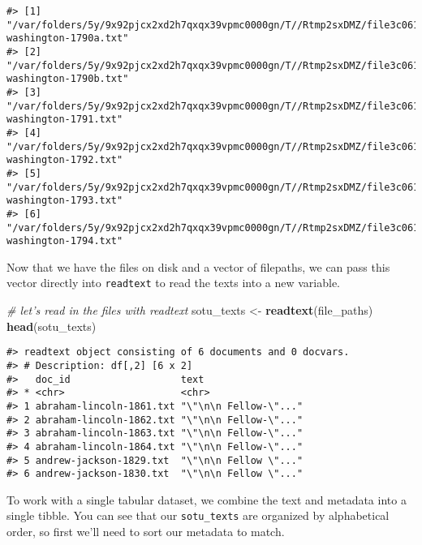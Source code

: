 \documentclass[]{book}
\newenvironment{Shaded}{\begin{snugshade}}{\end{snugshade}}
\newcommand{\CommentTok}[1]{\textcolor[rgb]{0.56,0.35,0.01}{\textit{#1}}}
\newcommand{\KeywordTok}[1]{\textcolor[rgb]{0.13,0.29,0.53}{\textbf{#1}}}
\newcommand{\NormalTok}[1]{#1}
\newcommand{\OperatorTok}[1]{\textcolor[rgb]{0.81,0.36,0.00}{\textbf{#1}}}
\newcommand{\StringTok}[1]{\textcolor[rgb]{0.31,0.60,0.02}{#1}}
\begin{document}
\begin{verbatim}
#> [1] "/var/folders/5y/9x92pjcx2xd2h7qxqx39vpmc0000gn/T//Rtmp2sxDMZ/file3c061f5b124b/george-washington-1790a.txt"
#> [2] "/var/folders/5y/9x92pjcx2xd2h7qxqx39vpmc0000gn/T//Rtmp2sxDMZ/file3c061f5b124b/george-washington-1790b.txt"
#> [3] "/var/folders/5y/9x92pjcx2xd2h7qxqx39vpmc0000gn/T//Rtmp2sxDMZ/file3c061f5b124b/george-washington-1791.txt" 
#> [4] "/var/folders/5y/9x92pjcx2xd2h7qxqx39vpmc0000gn/T//Rtmp2sxDMZ/file3c061f5b124b/george-washington-1792.txt" 
#> [5] "/var/folders/5y/9x92pjcx2xd2h7qxqx39vpmc0000gn/T//Rtmp2sxDMZ/file3c061f5b124b/george-washington-1793.txt" 
#> [6] "/var/folders/5y/9x92pjcx2xd2h7qxqx39vpmc0000gn/T//Rtmp2sxDMZ/file3c061f5b124b/george-washington-1794.txt"
\end{verbatim}

Now that we have the files on disk and a vector of filepaths, we can pass this vector directly into \texttt{readtext} to read the texts into a new variable.

\begin{Shaded}
\begin{Highlighting}[]
\CommentTok{# let's read in the files with readtext}
\NormalTok{sotu_texts <-}\StringTok{ }\KeywordTok{readtext}\NormalTok{(file_paths)}
\KeywordTok{head}\NormalTok{(sotu_texts)}
\end{Highlighting}
\end{Shaded}

\begin{verbatim}
#> readtext object consisting of 6 documents and 0 docvars.
#> # Description: df[,2] [6 x 2]
#>   doc_id                   text                 
#> * <chr>                    <chr>                
#> 1 abraham-lincoln-1861.txt "\"\n\n Fellow-\"..."
#> 2 abraham-lincoln-1862.txt "\"\n\n Fellow-\"..."
#> 3 abraham-lincoln-1863.txt "\"\n\n Fellow-\"..."
#> 4 abraham-lincoln-1864.txt "\"\n\n Fellow-\"..."
#> 5 andrew-jackson-1829.txt  "\"\n\n Fellow \"..."
#> 6 andrew-jackson-1830.txt  "\"\n\n Fellow \"..."
\end{verbatim}

To work with a single tabular dataset, we combine the text and metadata into a single tibble. You can see that our \texttt{sotu\_texts} are organized by alphabetical order, so first we'll need to sort our metadata to match.

\begin{Shaded}
\end{Shaded}
\end{document}
